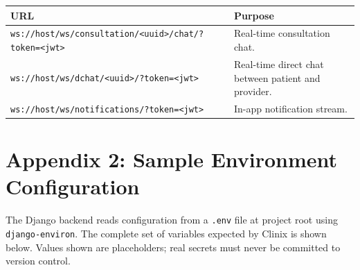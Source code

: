 \begin{longtable}{|p{6.5cm}|p{7.5cm}|}
\hline
\textbf{URL} & \textbf{Purpose} \\ \hline

\endhead
\texttt{ws://host/ws/consultation/<uuid>/chat/?token=<jwt>} & Real-time consultation chat. \\ \hline
\texttt{ws://host/ws/dchat/<uuid>/?token=<jwt>}             & Real-time direct chat between patient and provider. \\ \hline
\texttt{ws://host/ws/notifications/?token=<jwt>}            & In-app notification stream. \\ \hline

\end{longtable}

\section*{Appendix 2: Sample Environment Configuration}
\label{app:env-config}

The Django backend reads configuration from a \texttt{.env} file at
project root using \texttt{django-environ}. The complete set of
variables expected by Clinix is shown below. Values shown are
placeholders; real secrets must never be committed to version
control.

